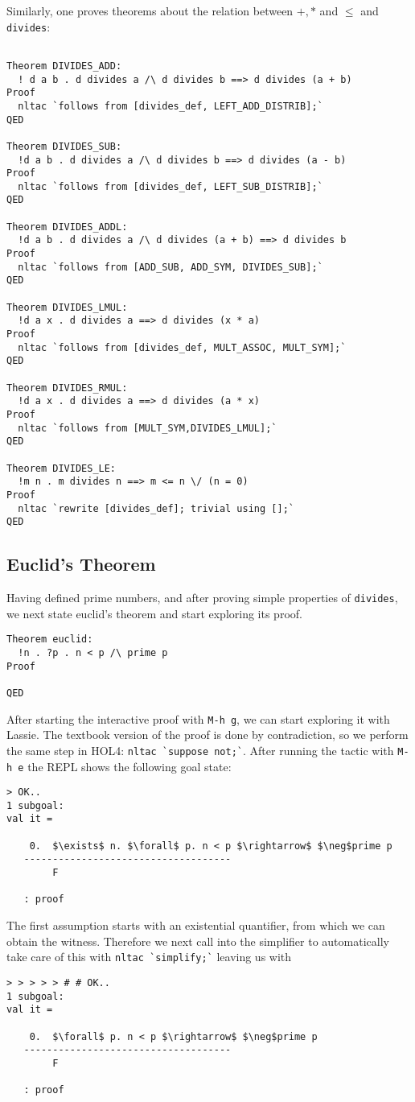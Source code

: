 \documentclass[10pt]{scrartcl}
\newcommand{\ekey}[1]{\texttt{#1}}
\begin{document}
Similarly, one proves theorems about the relation between $+, *$ and $\leq$ and
\lstinline{divides}:
\begin{lstlisting}

Theorem DIVIDES_ADD:
  ! d a b . d divides a /\ d divides b ==> d divides (a + b)
Proof
  nltac `follows from [divides_def, LEFT_ADD_DISTRIB];`
QED

Theorem DIVIDES_SUB:
  !d a b . d divides a /\ d divides b ==> d divides (a - b)
Proof
  nltac `follows from [divides_def, LEFT_SUB_DISTRIB];`
QED

Theorem DIVIDES_ADDL:
  !d a b . d divides a /\ d divides (a + b) ==> d divides b
Proof
  nltac `follows from [ADD_SUB, ADD_SYM, DIVIDES_SUB];`
QED

Theorem DIVIDES_LMUL:
  !d a x . d divides a ==> d divides (x * a)
Proof
  nltac `follows from [divides_def, MULT_ASSOC, MULT_SYM];`
QED

Theorem DIVIDES_RMUL:
  !d a x . d divides a ==> d divides (a * x)
Proof
  nltac `follows from [MULT_SYM,DIVIDES_LMUL];`
QED

Theorem DIVIDES_LE:
  !m n . m divides n ==> m <= n \/ (n = 0)
Proof
  nltac `rewrite [divides_def]; trivial using [];`
QED
\end{lstlisting}

\subsection{Euclid's Theorem}
Having defined prime numbers, and after proving simple properties of
\lstinline{divides}, we next state euclid's theorem and start
exploring its proof.

\begin{lstlisting}
Theorem euclid:
  !n . ?p . n < p /\ prime p
Proof

QED
\end{lstlisting}

After starting the interactive proof with \ekey{M-h g}, we can start exploring
it with Lassie.
The textbook version of the proof is done by contradiction, so we perform the
same step in HOL4: \lstinline{nltac `suppose not;`}.
After running the tactic with \ekey{M-h e} the REPL shows the following goal state:
\begin{lstlisting}[frame=single, mathescape=true]
> OK..
1 subgoal:
val it =

    0.  $\exists$ n. $\forall$ p. n < p $\rightarrow$ $\neg$prime p
   ------------------------------------
        F

   : proof
\end{lstlisting}
The first assumption starts with an existential quantifier, from which we can
obtain the witness. Therefore we next call into the simplifier to automatically
take care of this with \lstinline{nltac `simplify;`} leaving us with
\begin{lstlisting}[frame=single, mathescape=true]
> > > > > # # OK..
1 subgoal:
val it =

    0.  $\forall$ p. n < p $\rightarrow$ $\neg$prime p
   ------------------------------------
        F

   : proof
\end{lstlisting}
\end{document}
